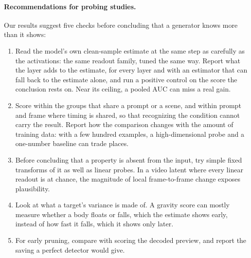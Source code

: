 \paragraph{Recommendations for probing studies.} Our results suggest five checks before concluding that a generator knows more than it shows:
\begin{enumerate}
    \item Read the model's own clean-sample estimate at the same step as carefully as the activations: the same readout family, tuned the same way. Report what the layer adds to the estimate, for every layer and with an estimator that can fall back to the estimate alone, and run a positive control on the score the conclusion rests on. Near its ceiling, a pooled AUC can miss a real gain.
    \item Score within the groups that share a prompt or a scene, and within prompt and frame where timing is shared, so that recognizing the condition cannot carry the result. Report how the comparison changes with the amount of training data: with a few hundred examples, a high-dimensional probe and a one-number baseline can trade places.
    \item Before concluding that a property is absent from the input, try simple fixed transforms of it as well as linear probes. In a video latent where every linear readout is at chance, the magnitude of local frame-to-frame change exposes plausibility.
    \item Look at what a target's variance is made of. A gravity score can mostly measure whether a body floats or falls, which the estimate shows early, instead of how fast it falls, which it shows only later.
    \item For early pruning, compare with scoring the decoded preview, and report the saving a perfect detector would give.
\end{enumerate}

